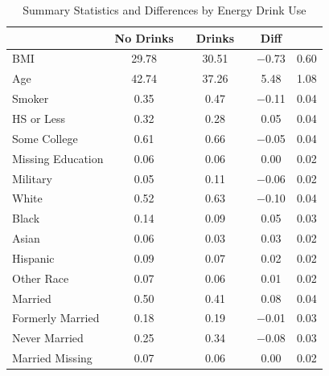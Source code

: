 \begin{table}[htbp]\centering
\def\sym#1{\ifmmode^{#1}\else\(^{#1}\)\fi}
\caption{Summary Statistics and Differences by Energy Drink Use}
\label{tab:diff}
\begin{tabular}{lccccc}
\toprule
 & No Drinks & & Drinks & & Diff & \\
\midrule
BMI & 29.78 & & 30.51 & & $-$0.73 & 0.60 \\
Age & 42.74 & & 37.26 & & 5.48 & 1.08 \\
Smoker & 0.35 & & 0.47 & & $-$0.11 & 0.04 \\
HS or Less & 0.32 & & 0.28 & & 0.05 & 0.04 \\
Some College & 0.61 & & 0.66 & & $-$0.05 & 0.04 \\
Missing Education & 0.06 & & 0.06 & & 0.00 & 0.02 \\
Military & 0.05 & & 0.11 & & $-$0.06 & 0.02 \\
White & 0.52 & & 0.63 & & $-$0.10 & 0.04 \\
Black & 0.14 & & 0.09 & & 0.05 & 0.03 \\
Asian & 0.06 & & 0.03 & & 0.03 & 0.02 \\
Hispanic & 0.09 & & 0.07 & & 0.02 & 0.02 \\
Other Race & 0.07 & & 0.06 & & 0.01 & 0.02 \\
Married & 0.50 & & 0.41 & & 0.08 & 0.04 \\
Formerly Married & 0.18 & & 0.19 & & $-$0.01 & 0.03 \\
Never Married & 0.25 & & 0.34 & & $-$0.08 & 0.03 \\
Married Missing & 0.07 & & 0.06 & & 0.00 & 0.02 \\
\bottomrule
\end{tabular}
\end{table}
